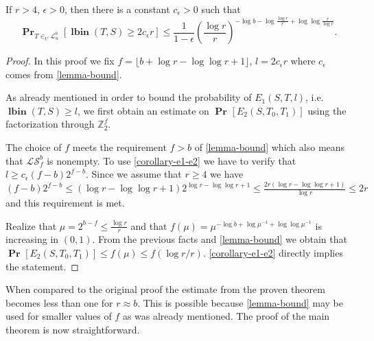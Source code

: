 \documentclass[unicode,review]{siamart1116}
\newcommand{\lbin}[2]{\operatorname{\mathbf{lbin}}({#1}, {#2})}
\newcommand{\vecspace}[2]{\mathbb{Z}_{#1}^{#2}}
\newcommand{\binvecspace}[1]{\vecspace{2}{#1}}
\newcommand{\linearmaps}[2]{\mathcal{L}_{#1}^{#2}}
\newcommand{\surjectivelinearmaps}[2]{\mathcal{LS}_{#1}^{#2}}
\newcommand{\probs}[2]{\operatorname{\mathbf{Pr}}_{{#1}}\left[{#2}\right]}
\newcommand{\prob}[1]{\probs{}{#1}}
\numberwithin{theorem}{section}
\begin{document}
\begin{theorem}
\label{theorem-prob-distribution-bound}
If $r > 4$, $\epsilon > 0$, then there is a constant $c_\epsilon > 0$ such that
\[
\probs{T \in_U \linearmaps{u}{b}}{\lbin{T}{S} \geq 2 c_\epsilon r} \leq \frac{1}{1 - \epsilon}\left(\frac{\log r}{r}\right)^{-\log b - \log \frac{\log r}{r} + \log \log \frac{r}{\log r}}.
\]
\end{theorem}
\begin{proof}
In this proof we fix $f = \lfloor b + \log r - \log \log r + 1 \rfloor$, $l = 2c_\epsilon r$ where $c_\epsilon$ comes from \cref{lemma-bound}.

As already mentioned in order to bound the probability of $E_1(S, T, l)$, i.e. $\lbin{T}{S} \geq l$, we first obtain an estimate on $\prob{E_2(S, T_0, T_1)}$ using the factorization through $\binvecspace{f}$. 

The choice of $f$ meets the requirement $f > b$ of \cref{lemma-bound} which also means that $\surjectivelinearmaps{f}{b}$ is nonempty.
To use \cref{corollary-e1-e2} we have to verify that $l \geq c_\epsilon (f - b)2^{f - b}$.
Since we assume that $r \geq 4$ we have $(f - b)2^{f - b} \leq (\log r - \log \log r + 1)2^{\log r - \log \log r + 1} \leq \frac{2r(\log r - \log \log r + 1)}{\log r} \leq 2r$ and this requirement is met.

Realize that $\mu = 2^{b - f} \leq \frac{\log r}{r}$ and that $f(\mu) = \mu ^ {- \log b + \log \mu^{-1} + \log \log \mu^{-1}}$ is increasing in $(0, 1)$.
From the previous facts and \cref{lemma-bound} we obtain that $\prob{E_2(S, T_0, T_1)} \leq f(\mu) \leq f(\log r/r)$.
\cref{corollary-e1-e2} directly implies the statement.
\end{proof}

When compared to the original proof the estimate from the proven theorem becomes less than one for $r \approx b$. 
This is possible because \cref{lemma-bound} may be used for smaller values of $f$ as was already mentioned.
The proof of the main theorem is now straightforward.
\end{document}
